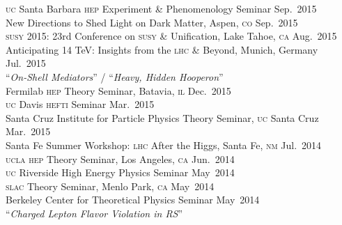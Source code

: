 \documentclass[margin,line]{resume}
\newcommand{\mytalksep}{-.1mm}
\newcommand{\mytalkskip}{2mm}
\newcommand{\scap}[1]{\textsc{\MakeLowercase{#1}}}
\begin{document}
\begin{resume}
%
\scap{UC} Santa Barbara \scap{HEP} Experiment \& Phenomenology Seminar
\hfill %
Sep.~2015\vspace{\mytalksep}\\  
%
New Directions to Shed Light on Dark Matter, Aspen, \scap{CO} 
\hfill %
Sep.~2015\vspace{\mytalksep}\\   
%
\scap{SUSY} 2015: 23rd Conference on \scap{SUSY} \& Unification, Lake Tahoe, \scap{CA}
\hfill %
Aug.~2015\vspace{\mytalksep}\\   
%
Anticipating 14 TeV: Insights %
from the \textsc{lhc} \& Beyond, Munich, Germany
\hfill %
Jul.~2015\vspace{\mytalkskip}\\
%
%
%
``\emph{On-Shell Mediators}'' / 
``\emph{Heavy, Hidden Hooperon}''
\vspace{\mytalksep}\\ 
Fermilab \scap{HEP} Theory Seminar, Batavia, \scap{IL}
\hfill %
Dec.~2015\vspace{\mytalksep}\\   
%
\scap{UC} Davis \scap{HEFTI} Seminar
\hfill %
Mar.~2015\vspace{\mytalksep}\\   
%
Santa Cruz Institute for Particle Physics Theory Seminar, \scap{UC} Santa Cruz
\hfill %
Mar.~2015\vspace{\mytalksep}\\   
%
Santa Fe Summer Workshop: \scap{LHC} After the Higgs, Santa Fe, \scap{NM} 
\hfill %
Jul.~2014\vspace{\mytalksep}\\   
%
\scap{UCLA HEP} Theory Seminar, Los Angeles, \scap{CA}
\hfill %
Jun.~2014\vspace{\mytalksep}\\ 
%
\scap{UC} Riverside High Energy Physics Seminar
\hfill %
May~2014\vspace{\mytalksep}\\   
%
\scap{SLAC} Theory Seminar, Menlo Park, \scap{CA}
\hfill %
May~2014\vspace{\mytalksep}\\   
%
Berkeley Center for Theoretical Physics Seminar%
\hfill %
May~2014\vspace{\mytalkskip}\\
%
%
%
``\emph{Charged Lepton Flavor Violation in RS}'' 

\end{resume}
\end{document}
